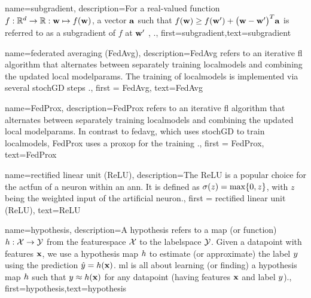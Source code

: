 {name={subgradient},
description={For a real-valued function $f: \mathbb{R}^{d} \rightarrow \mathbb{R}: {\bf w} \mapsto f({\bf w})$, 
		a vector ${\bf a}$ such that $f({\bf w}) \geq  f({\bf w}') +\big({\bf w}-{\bf w}' \big)^{T} {\bf a}$ is 
		referred to as a subgradient of $f$ at ${\bf w}'$ \cite{BertCvxAnalOpt}, \cite{BertsekasNonLinProgr}.},
	first={subgradient},text={subgradient} 
}

{name={federated averaging (FedAvg)},
	description={FedAvg refers to an iterative \gls{fl} \gls{algorithm} that alternates between separately training \gls{localmodel}s and combining the updated local \gls{modelparams}. The training of \gls{localmodel}s 
		is implemented via several \gls{stochGD} steps \cite{pmlr-v54-mcmahan17a}.}, 
		first = {FedAvg}, text={FedAvg} 
}

{name={FedProx},
	description={FedProx refers to an iterative \gls{fl} \gls{algorithm} that alternates between separately training \gls{localmodel}s and combining the updated local \gls{modelparams}. In contrast to \gls{fedavg}, which uses 
		\gls{stochGD} to train \gls{localmodel}s, FedProx uses a \gls{proxop} for the training \cite{FedProx2020}.}, 
	first = {FedProx}, text={FedProx} 
}

{name={rectified linear unit (ReLU)},
	description={The ReLU is 
		a popular choice for the \gls{actfun} of a neuron within an \gls{ann}. It is defined 
		as $\sigma(z) = \max\{0,z\}$, with $z$ being the weighted input of the artificial 
		neuron.}, first = {rectified linear unit (ReLU)}, text={ReLU} 
}

{name={hypothesis},
	description={A hypothesis refers to a map (or function) $h: \mathcal{X} \rightarrow \mathcal{Y}$ from the 
		\gls{featurespace} $\mathcal{X}$ to the \gls{labelspace} $\mathcal{Y}$. 
		Given a \gls{datapoint} with \gls{feature}s ${\bf x}$, we use a hypothesis map $h$
		to estimate (or approximate) the \gls{label} $y$ using the \gls{prediction}  
		$\hat{y} = h({\bf x})$. \Gls{ml} is all about learning (or finding) a 
		hypothesis map $h$ such that $y \approx h({\bf x})$ 
		for any \gls{datapoint} (having \gls{feature}s ${\bf x}$ and \gls{label} $y$).},
	first={hypothesis},text={hypothesis}  
}



